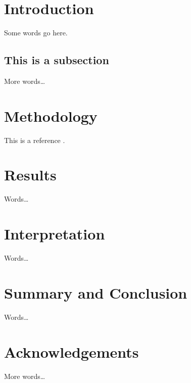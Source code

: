 \documentclass[10pt,a4paper]{article}
\begin{document}
\title{}

\author{Ireneusz Kubiak \and Joe Loughry}

\maketitle

\begin{abstract}
	
\end{abstract}

\section{Introduction}

Some words go here.

\subsection{This is a subsection}

More words\ldots

\newpage

\section{Methodology}

This is a reference \cite{Loughry2013a}.

\section{Results}

Words\ldots

\section{Interpretation}

Words\ldots

\section{Summary and Conclusion}

Words\ldots

\section{Acknowledgements}

More words\ldots



\end{document}
